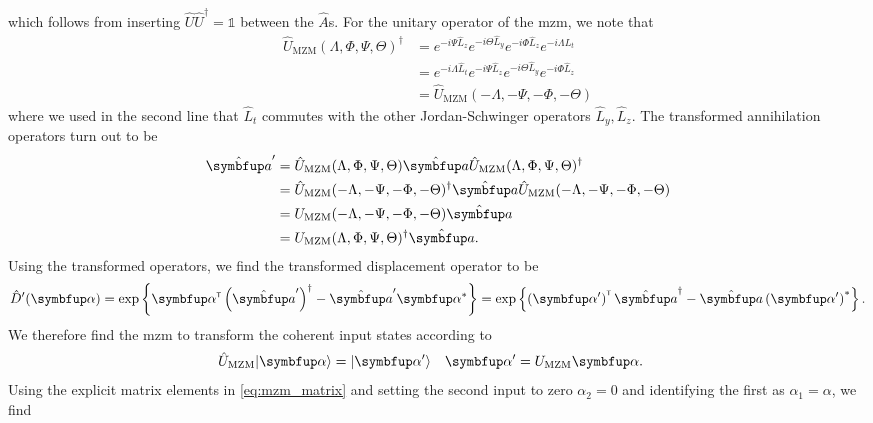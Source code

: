 which follows from inserting $\hat{U}\hat{U}^\dagger=\mathbb{1}$ between the $\hat{A}$s.
For the unitary operator of the \gls{mzm}, we note that
\begin{equation}
	\begin{split}
		\hat{U}_\text{MZM}(\Lambda,\Phi,\Psi,\Theta)^\dagger
		&=
		e^{-i\Psi\hat{L}_z}
		e^{-i\Theta\hat{L}_y}
		e^{-i\Phi\hat{L}_z}
		e^{-i\Lambda\hat{L}_t}
		\\
		&=
		e^{-i\Lambda\hat{L}_t}
		e^{-i\Psi\hat{L}_z}
		e^{-i\Theta\hat{L}_y}
		e^{-i\Phi\hat{L}_z}
		\\
		&=
		\hat{U}_\text{MZM}(-\Lambda,-\Psi,-\Phi,-\Theta)
	\end{split}
\end{equation}
where we used in the second line that $\hat{L}_t$ commutes with the other Jordan-Schwinger operators $\hat{L}_y,\hat{L}_z$.
The transformed annihilation operators turn out to be
\begin{equation}
	\begin{split}
		\hat{\vb{a}}^\prime
		&=
		\hat{U}_\text{MZM}(\Lambda,\Phi,\Psi,\Theta)
		\hat{\vb{a}}
		\hat{U}_\text{MZM}(\Lambda,\Phi,\Psi,\Theta)^\dagger
		\\
		&=
		\hat{U}_\text{MZM}(-\Lambda,-\Psi,-\Phi,-\Theta)^\dagger
		\hat{\vb{a}}
		\hat{U}_\text{MZM}(-\Lambda,-\Psi,-\Phi,-\Theta)
		\\
		&=
		U_\text{MZM}(-\Lambda,-\Psi,-\Phi,-\Theta)
		\hat{\vb{a}}
		\\
		&=
		U_\text{MZM}(\Lambda,\Phi,\Psi,\Theta)^\dagger
		\hat{\vb{a}}
		.
	\end{split}
\end{equation}
Using the transformed operators, we find the transformed displacement operator to be~\cite[p.~210]{Vogel2006}
\begin{equation}
	\hat{D}^\prime(\vb{\alpha})
	=
	\exp\left\{
		\vb{\alpha}^\trans
		\left(\hat{\vb{a}}^\prime\right)^\dagger
		-
		\hat{\vb{a}}^\prime
		\vb{\alpha}^*
	\right\}
	=
	\exp\left\{
		\left(\vb{\alpha}^\prime\right)^\trans
		\hat{\vb{a}}^\dagger
		-
		\hat{\vb{a}}
		\left(\vb{\alpha}^\prime\right)^*
	\right\}
	.
\end{equation}
We therefore find the \gls{mzm} to transform the coherent input states according to
\begin{align}
	\hat{U}_\text{MZM}
	\ket{\vb{\alpha}}
	&=
	\ket{\vb{\alpha}^\prime}
	&
	\vb{\alpha}^\prime
	&=
	U_\text{MZM}
	\vb{\alpha}
	.
\end{align}
Using the explicit matrix elements in \cref{eq:mzm_matrix} and setting the second input to zero $\alpha_2=0$ and identifying the first as $\alpha_1=\alpha$, we find
